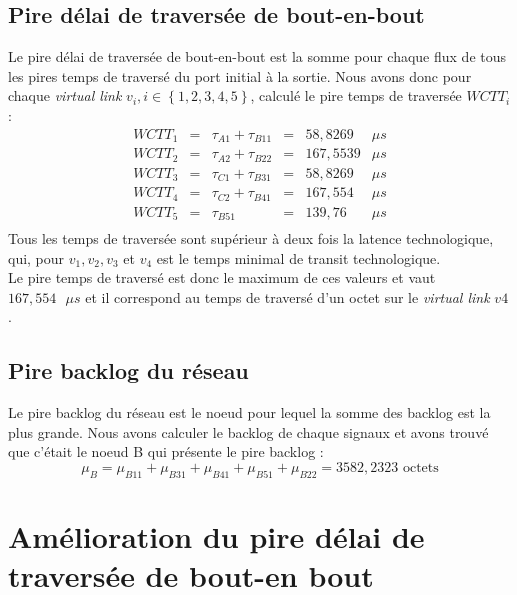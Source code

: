 \subsection{Pire délai de traversée de bout-en-bout}
Le pire délai de traversée de bout-en-bout est la somme pour chaque flux de tous les pires temps de traversé du port initial à la sortie.
Nous avons donc pour chaque \emph{virtual link} $v_i, i \in \left\lbrace 1,2,3,4,5\right\rbrace$, calculé le pire temps de traversée $WCTT_i$ :
\begin{equation}
\begin{array}{lclcll}
WCTT_1	&=&	\tau_{A1} + \tau_{B11} 	&=& 58,8269&\mu s\\
WCTT_2	&=&	\tau_{A2} + \tau_{B22} 	&=& 167,5539&\mu s\\
WCTT_3	&=&	\tau_{C1} + \tau_{B31} 	&=& 58,8269	&\mu s\\
WCTT_4	&=&	\tau_{C2} + \tau_{B41} 	&=& 167,554	&\mu s\\
WCTT_5	&=&	\tau_{B51} 				&=& 139,76	&\mu s\\
\end{array}
\end{equation}
Tous les temps de traversée sont supérieur à deux fois la latence technologique, qui, pour $v_1, v_2, v_3$ et $v_4$ est le temps minimal de transit technologique.\\

Le pire temps de traversé est donc le maximum de ces valeurs et vaut $167,554 \text{ }\mu s$ et il correspond au temps de traversé d'un octet sur le \emph{virtual link} $v4$.
\subsection{Pire backlog du réseau}
Le pire backlog du réseau est le noeud pour lequel la somme des backlog est la plus grande.
Nous avons calculer le backlog de chaque signaux et avons trouvé que c'était le noeud B qui présente le pire backlog : 
\begin{equation}
\mu_B = \mu_{B11} + \mu_{B31} + \mu_{B41} + \mu_{B51} + \mu_{B22}  = 3582,2323 \text{ octets}
\end{equation}
\section{Amélioration du pire délai de traversée de bout-en bout}
